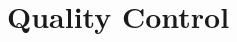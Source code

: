 \documentclass[a4paper,11pt]{report}
\begin{document}
\chapter{Quality Control}





\newpage{}
\printindex

%
\end{document}
